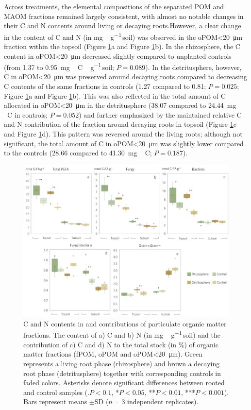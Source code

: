 Across treatments, the elemental compositions of the separated POM and MAOM fractions remained largely consistent, with almost no notable changes in their C and N contents around living or decaying roots.However, a clear change in the content of C and N (in \si{mg\,\gram^{-1}}\,soil) was observed in the oPOM<\SI{20}{\micro\metre} fraction within the topsoil (Figure \ref{fig:M5-F2}a and Figure \ref{fig:M5-F2}b). In the rhizosphere, the C content in oPOM<\SI{20}{\micro\metre} decreased slightly compared to unplanted controls (from \num{1.37} to \SI{0.95}{mg\,C\,\gram^{-1}}\,soil; \(P= 0.089\)). In the detritusphere, however, C in oPOM<\SI{20}{\micro\metre} was preserved around decaying roots compared to decreasing C contents of the same fractions in controls (\num{1.27} compared to \num{0.81}; \(P=0.025\); Figure \ref{fig:M5-F2}a and Figure \ref{fig:M5-F2}b). This was also reflected in the total amount of C allocated in oPOM<\SI{20}{\micro\metre} in the detritusphere (\num{38.07} compared to \SI{24.44}{mg\,C} in controls; \(P=0.052\)) and further emphasized by the maintained relative C and N contribution of the fraction around decaying roots in topsoil (Figure \ref{fig:M5-F2}c and Figure \ref{fig:M5-F2}d). This pattern was reversed around the living roots; although not significant, the total amount of C in oPOM<\SI{20}{\micro\metre} was slightly lower compared to the controls (\num{28.66} compared to \SI{41.30}{mg\,C}; \(P=0.187\)).

\begin{figure}[H]
	\centering
	\includegraphics[width=1\textwidth]{img/M5-Figure_2.png}
	\caption{C and N contents in and contributions of particulate organic matter fractions. The content of a) C and b) N (in \si{mg\,\gram^{-1}}\,soil) and the contribution of c) C and d) N to the total stock (in \%) of organic matter fractions (fPOM, oPOM and oPOM<\SI{20}{\micro\metre}). Green represents a living root phase (rhizosphere) and brown a decaying root phase (detritusphere) together with corresponding controls in faded colors. Asterisks denote significant differences between rooted and control samples (\(.P < 0.1\), *\(P < 0.05\), **\(P < 0.01\), ***\(P < 0.001\)). Bars represent means \(\pm\)SD (\(n=3\) independent replicates).}
	\label{fig:M5-F2}
\end{figure}

